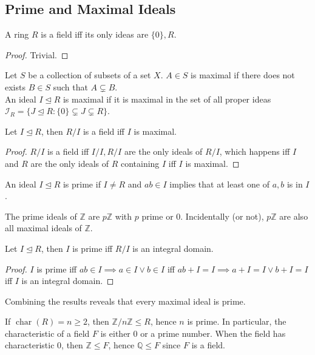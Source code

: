 \subsection{Prime and Maximal Ideals}
\begin{lemma}
    A ring $R$ is a field iff its only ideas are $\{0\},R$.
\end{lemma}
\begin{proof}
    Trivial.
\end{proof}
\begin{definition}
    Let $S$ be a collection of subsets of a set $X$.
    $A\in S$ is maximal if there does not exists $B\in S$ such that $A\subsetneq B$.\\
    An ideal $I\unlhd R$ is maximal if it is maximal in the set of all proper ideas $\mathcal I_R=\{J\unlhd R:\{0\}\subsetneq J\subsetneq R\}$.
\end{definition}
\begin{proposition}
    Let $I\unlhd R$, then $R/I$ is a field iff $I$ is maximal.
\end{proposition}
\begin{proof}
    $R/I$ is a field iff $I/I,R/I$ are the only ideals of $R/I$, which happens iff $I$ and $R$ are the only ideals of $R$ containing $I$ iff $I$ is maximal.
\end{proof}
\begin{definition}
    An ideal $I\unlhd R$ is prime if $I\neq R$ and $ab\in I$ implies that at least one of $a,b$ is in $I$.
\end{definition}
\begin{example}
    The prime ideals of $\mathbb Z$ are $p\mathbb Z$ with $p$ prime or $0$.
    Incidentally (or not), $p\mathbb Z$ are also all maximal ideals of $\mathbb Z$.
\end{example}
\begin{proposition}
    Let $I\unlhd R$, then $I$ is prime iff $R/I$ is an integral domain.
\end{proposition}
\begin{proof}
    $I$ is prime iff $ab\in I\implies a\in I\lor b\in I$ iff $ab+I=I\implies a+I=I\lor b+I=I$ iff $I$ is an integral domain.
\end{proof}
\begin{remark}
    Combining the results reveals that every maximal ideal is prime.
\end{remark}
\begin{remark}
    If $\operatorname{char}(R)=n\ge 2$, then $\mathbb Z/n\mathbb Z\le R$, hence $n$ is prime.
    In particular, the characteristic of a field $F$ is either $0$ or a prime number.
    When the field has characteristic $0$, then $\mathbb Z\le F$, hence $\mathbb Q\le F$ since $F$ is a field.
\end{remark}